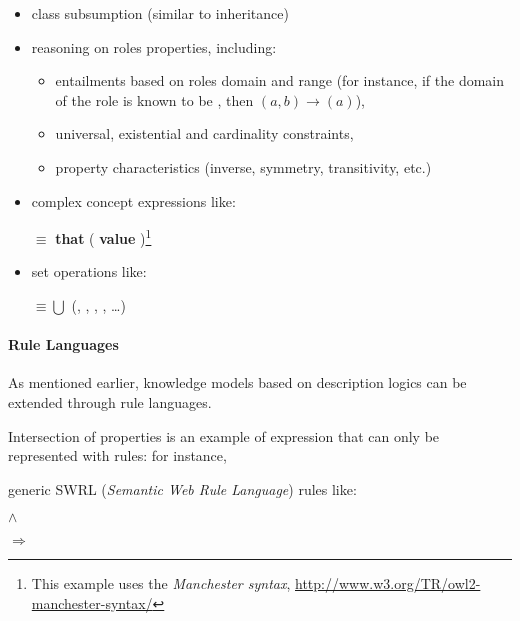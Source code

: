 \begin{itemize}
    \item class subsumption (similar to inheritance)

    \item reasoning on roles properties, including:
        \begin{itemize}
        \item entailments based on roles domain and range (for instance, if the
        domain of the role  is known to be
        , then $(a, b) \to
        $$(a)$),

        \item universal, existential and cardinality constraints,

        \item property characteristics (inverse, symmetry, transitivity, etc.)

        \end{itemize}

    \item complex concept expressions like: \par \footnotesize {}
    $\equiv$  {\bf that} ( {\bf value}
    )\footnote{This example uses the \emph{Manchester
    syntax}, \url{http://www.w3.org/TR/owl2-manchester-syntax/}} \normalsize

    \item set operations like: \par \footnotesize {} $\equiv \bigcup$ (, , ,
    , \ldots) \normalsize

\end{itemize}

\paragraph{Rule Languages}

As mentioned earlier, knowledge models based on description logics can be extended through rule languages.

Intersection of properties is an example of expression that can only be represented with rules: for instance, 

generic SWRL ({\em Semantic Web Rule Language}) rules like: \par
        \footnotesize {} $\land$
         \par $\Rightarrow$ 
        \normalsize 


